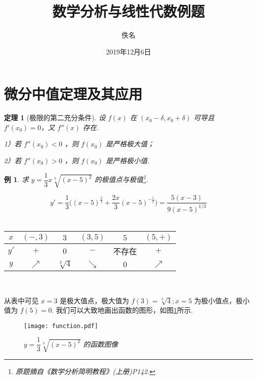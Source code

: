 \documentclass[UTF8,11pt]{ctexart}
\title{数学分析与线性代数例题}
\author{佚名}
\date{2019年12月6日}
\newtheorem{theorem}{定理}
\newtheorem{exmp}{例}
\begin{document}
\maketitle{}
\tableofcontents


\section{微分中值定理及其应用}
\begin{theorem}[极限的第二充分条件]设 $f(x)$ 在 $(x_0-\delta,x_0+\delta)$ 可导且 $f'(x_0)=0$，又 $f''(x)$ 存在.

\vspace{5mm}
1）若 $f''(x_0)<0$ ，则 $f(x_0)$ 是严格极大值；

\vspace{5mm}
2）若 $f''(x_0)>0$ ，则 $f(x_0)$ 是严格极小值.

\end{theorem}
\begin{exmp}
\kaishu 求 $y=\dfrac{1}{3}x\sqrt[3]{(x-5)^2}$ 的极值点与极值\footnote{原题摘自《数学分析简明教程》(上册)P142.}.
\end{exmp}
\begin{equation}
\label{eq:prob}
y'=\dfrac{1}{3}\Big({(x-5)}^{\frac{2}{3}}+\dfrac{2x}{3}(x-5)^{-\frac{1}{3}}\Big)=\dfrac{5(x-3)}{9(x-5)^{1/3}}
\end{equation}
\\
\vspace{-6mm}
\begin{center}
\begin{tabular}{|c|c|c|c|c|c|}\hline
$x$&$(-,3)$&$3$&$(3,5)$&$5$&$(5,+)$\\\hline
$y'$&$+$&$0$&$-$&不存在&$+$\\\hline
$y$&$\nearrow$&$\sqrt[3]{4}$&$\searrow$&$0$&$\nearrow$\\\hline
\end{tabular}\\
\end{center}

\kaishu 从表中可见 $x = 3$ 是极大值点，极大值为 $f(3) = \sqrt[3]{4};x = 5$ 为极小值点，极小值为 $f(5) = 0$. 我们可以大致地画出函数的图形，如图\ref{fig:function}所示.
\newpage
\begin{figure}[ht]
\begin{center}
\texttt{[image: function.pdf]}
\caption{\small\it  $y=\dfrac{1}{3}\sqrt[3]{(x−5)^2}$  的函数图像}
\label{fig:function}
\end{center}
\end{figure}
\end{document}
